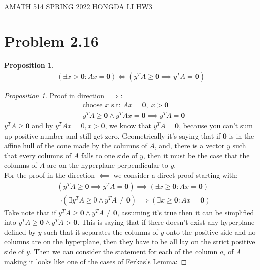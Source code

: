 \documentclass[]{article}
\theoremstyle{definition}
\newtheorem{prop}{Proposition}[section]  %
\begin{document}
\begin{center}
    AMATH 514 SPRING 2022 HONGDA LI HW3
\end{center}
\section{Problem 2.16}
    \begin{prop}
        \begin{align}
            (\exists x > \mathbf 0: Ax = \mathbf 0 )
            \iff 
            (y^TA \ge \mathbf 0 \implies y^TA = \mathbf 0)
        \end{align}
    \end{prop}
    \begin{proof}[Proposition 1]
        Proof in direction $\implies$: 
        \begin{align}
            &\text{choose }x \text{ s.t: } Ax = \mathbf 0 ,\; x > \mathbf 0
            \\
            & y^TA \ge\mathbf 0 \wedge y^TAx = \mathbf 0 \implies y^TA = \mathbf 0
        \end{align}
        $y^TA \ge \mathbf 0$ and by $y^TAx = 0, x> \mathbf 0$, we know that $y^TA = \mathbf 0$, because you can't sum up positive number and still get zero. Geometrically it's saying that if $\mathbf 0$ is in the affine hull of the cone made by the columns of $A$, and, there is a vector $y$ such that every columns of $A$ falls to one side of $y$, then it must be the case that the columns of $A$ are on the hyperplane perpendicular to $y$. 
        \\
        \noindent
        For the proof in the direction $\impliedby$ we consider a direct proof starting with: 
        \begin{align}
            & (y^TA \ge \mathbf 0 \implies y^TA= \mathbf 0)
            \implies 
            (\exists x \ge \mathbf 0: Ax = \mathbf 0)
            \\
            & \neg(\exists y^TA \ge 0 \wedge y^TA \neq \mathbf 0)
            \implies 
            (\exists x \ge \mathbf 0: Ax = \mathbf 0)
        \end{align}
        Take note that if $y^TA \ge \mathbf 0 \wedge y^TA \neq \mathbf 0$, assuming it's true then it can be simplified into $y^TA \ge \mathbf 0 \wedge y^TA > \mathbf 0$. This is saying that if there doesn't exist any hyperplane defined by $y$ such that it separates the columns of $y$ onto the positive side and no columns are on the hyperplane, then they have to be all lay on the strict positive side of $y$. Then we can consider the statement for each of the column $a_i$ of $A$ making it looks like one of the cases of Ferkas's Lemma: 

\end{proof}
\end{document}
